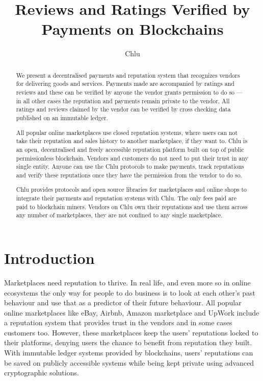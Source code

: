 \documentclass[a4paper]{article}
\title{Reviews and Ratings Verified by Payments on Blockchains}
\author{
  Chlu
}
\begin{document}
\maketitle

\begin{abstract}

We present a decentralised payments and reputation system that
recognizes vendors for delivering goods and services. Payments made
are accompanied by ratings and reviews and these can be verified by
anyone the vendor grants permission to do so --- in all other cases the
reputation and payments remain private to the vendor. All ratings and
reviews claimed by the vendor can be verified by cross checking data
published on an immutable ledger.

All popular online marketplaces use closed reputation systems, where
users can not take their reputation and sales history to another
marketplace, if they want to. Chlu is an open, decentralised and
freely accessible reputation platform built on top of public
permissionless blockchain. Vendors and customers do not need to put
their trust in any single entity. Anyone can use the Chlu protocols to
make payments, track reputations and verify these reputations once
they have the permission from the vendor to do so.

Chlu provides protocols and open source libraries for marketplaces and
online shops to integrate their payments and reputation systems with
Chlu. The only fees paid are paid to blockchain miners. Vendors on
Chlu own their reputations and use them across any number of
marketplaces, they are not confined to any single marketplace.

\end{abstract}

\section{Introduction}

Marketplaces need reputation to thrive. In real life, and even more so
in online ecosystems the only way for people to do business is to look
at each other's past behaviour and use that as a predictor of their
future behaviour. All popular online marketplaces like eBay, Airbnb,
Amazon marketplace and UpWork include a reputation system that
provides trust in the vendors and in some cases customers
too. However, these marketplaces keep the users' reputations locked to
their platforms, denying users the chance to benefit from reputation
they built. With immutable ledger systems provided by blockchains,
users' reputations can be saved on publicly accessible systems while
being kept private using advanced cryptographic solutions.
\end{document}
